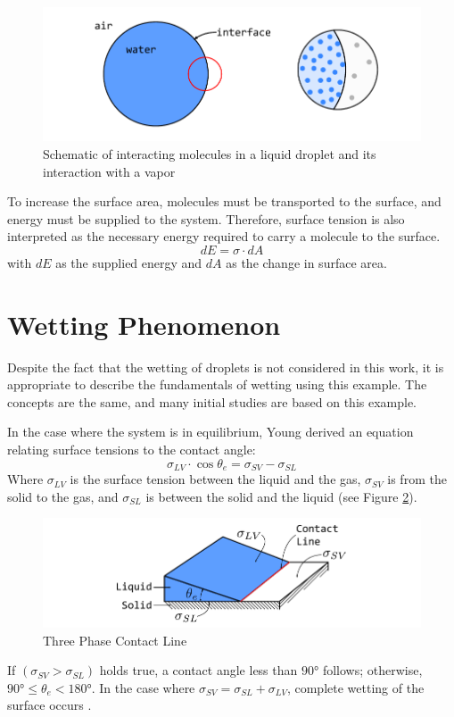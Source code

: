 \begin{figure}[h]
    \centering
    \includegraphics[width=.9\textwidth]{Pictures/moleculesAhesionCohesion_Wetting.pdf}
    \caption{Schematic of interacting molecules in a liquid droplet and its interaction with a vapor}
    \label{fig: WettingTheory_SurfaceTensionMolecules}
\end{figure}
To increase the surface area, molecules must be transported to the surface, and energy must be supplied to the system. Therefore, surface tension is also interpreted as the necessary energy required to carry a molecule to the surface.
\begin{equation}
    dE = \sigma \cdot dA
\end{equation}
with \(dE\) as the supplied energy and \(dA\) as the change in surface area.


\section{Wetting Phenomenon}
Despite the fact that the wetting of droplets is not considered in this work, it is appropriate to describe the fundamentals of wetting using this example. The concepts are the same, and many initial studies are based on this example.

In the case where the system is in equilibrium, Young  derived an equation relating surface tensions to the contact angle:
\begin{equation}
    \sigma_{LV} \cdot \cos\theta_e = \sigma_{SV}-\sigma_{SL}
    \label{eq: YoungsEQ}
\end{equation}
Where $\sigma_{LV}$ is the surface tension between the liquid and the gas, $\sigma_{SV}$ is from the solid to the gas, and $\sigma_{SL}$ is between the solid and the liquid (see Figure \ref{fig: YoungsLaw_ThreePhaseContactLine}).
\begin{figure}[h]
    \centering
    \includegraphics[width=.9\textwidth]{Pictures/YoungsLaw.pdf}
    \caption{Three Phase Contact Line}
    \label{fig: YoungsLaw_ThreePhaseContactLine}
\end{figure}
If $(\sigma_{SV}>\sigma_{SL})$ holds true, a contact angle less than $90°$ follows; otherwise, $90°\leq \theta_e<180°$. In the case where $\sigma_{SV}=\sigma_{SL}+\sigma_{LV}$, complete wetting of the surface occurs \cite{buttPhysicsChemistryInterfaces}.

